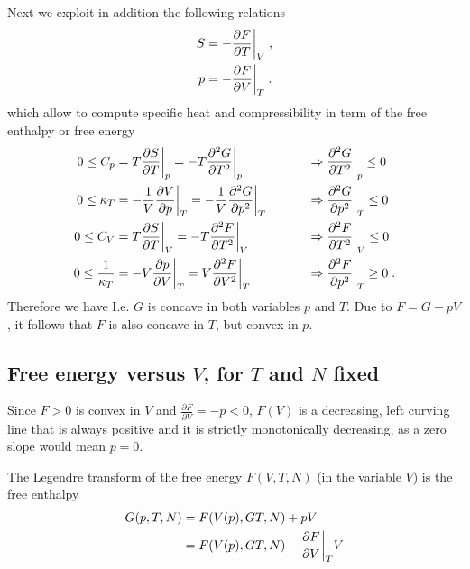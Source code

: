 Next we exploit in addition the following relations 
%
\begin{align}\label{eq:}
S &=-\frac{\partial F}{\partial T}\bigg|_{V}\;,\\
p &=-\frac{\partial F}{\partial V}\bigg|_{T}\;.
\end{align}
%
which allow to compute specific heat and compressibility in term of the free enthalpy or free energy
%
\begin{align}\label{eq}
0\le C_{p}&= T \frac{\partial S}{\partial T}\bigg|_{p} =-T 
\frac{\partial^{2} G}{\partial T^{2}}\bigg|_{p}\;\quad &&\Rightarrow \frac{\partial^{2} G}{\partial T^{2}}\bigg|_{p}\le 0\\
0\le \kappa_{T} &= -\frac{1}{V}\frac{\partial V}{\partial p}\bigg|_{T}  =-\frac{1}{V}\frac{\partial^{2} G}{\partial p^{2}}\bigg|_{T}\;\qquad&&\Rightarrow\frac{\partial^{2} G}{\partial p^{2}}\bigg|_{T}\le 0\\
0\le C_{V}&= T \frac{\partial S}{\partial T}\bigg|_{V} =
-T \frac{\partial^{2} F}{\partial T^{2}}\bigg|_{V}\;\quad &&\Rightarrow \frac{\partial^{2} F}{\partial T^{2}}\bigg|_{V}\le 0\\
0\le \frac{1}{\kappa_{T}} &= -V \frac{\partial p}{\partial V}\bigg|_{T}  
=V \frac{\partial^{2} F}{\partial V^{2}}\bigg|_{T}\;\qquad&&\Rightarrow\frac{\partial^{2} F}{\partial p^{2}}\bigg|_{T}\ge 0\;.
\end{align}
%
Therefore we have
%
I.e. $G$ is concave in both variables $p$ and $T$. Due to $F=G-pV$, it follows that
$F$ is also concave in $T$, but convex in $p$.

\subsection{Free energy versus $V$, for $T$ and $N$ fixed}
Since $F>0$ is convex in $V$ and $\frac{\partial F}{\partial V}=-p<0$, $F(V)$  is a decreasing,   left curving line that is always positive and it is strictly monotonically decreasing, as a zero slope  would mean $p=0$. 

The Legendre transform of the free energy $F(V,T,N)$ (in the variable $V$) is the free enthalpy %
\begin{align*}
G(p,T,N) &= F(V(p),GT,N) + p V \\
&= F(V(p),GT,N) - \frac{\partial  F}{\partial V}\bigg|_{T} V
\end{align*}
%


